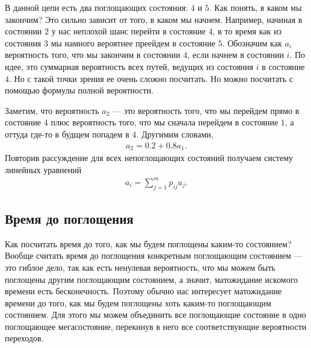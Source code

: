 \documentclass[12pt]{article}
\begin{document}
В данной цепи есть два поглощающих состояния: $4$ и $5$. Как понять, в каком мы закончим? Это сильно зависит от того, в каком мы начнем. Например, начиная в состоянии $2$ у нас неплохой шанс перейти в состояние $4$, в то время как из состояния $3$ мы намного вероятнее преейдем в состояние $5$. Обозначим как $a_i$ вероятность того, что мы закончим в состоянии $4$, если начнем в состоянии $i$. По идее, это суммарная вероятность всех путей, ведущих из состояния $i$ в состояние $4$. Но с такой точки зрения ее очень сложно посчитать. Но можно посчитать с помощью формулы полной вероятности.

Заметим, что вероятность $a_2$ --- это вероятность того, что мы перейдем прямо в состояние $4$ плюс вероятность того, что мы сначала перейдем в состояние $1$, а оттуда где-то в будщем попадем в $4$. Другимим словами,
\begin{align*}
  a_2 = 0.2 + 0.8 a_1.
\end{align*}
Повторив рассуждение для всех непоглощающих состояний получаем систему линейных уравнений
\begin{align*}
  a_i = \sum_{j = 1}^{m} p_{ij} a_j.
\end{align*}

\subsection{Время до поглощения}

Как посчитать время до того, как мы будем поглощены каким-то состоянием? Вообще считать время до поглощения конкретным поглощающим состоянием --- это гиблое дело, так как есть ненулевая вероятность, что мы можем быть поглощены другим поглощающим состоянием, а значит, матожидание искомого времени есть бесконечность. Поэтому обычно нас интересует матожидание времени до того, как мы будем поглощены хоть каким-то поглощающим состоянием. Для этого мы можем объединить все поглощающие состояние в одно поглощающее мегасостояние, перекинув в него все соответствующие вероятности переходов. 
\end{document}
